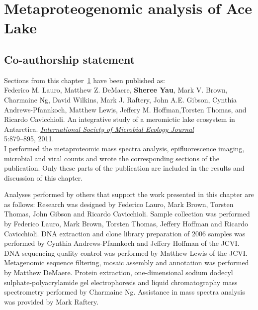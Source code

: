 \chapter{Metaproteogenomic analysis of Ace Lake}
\label{ch:ace}
\section*{Co-authorship statement}

Sections from this chapter~\ref{ch:ace} have been published as:\\

Federico M. Lauro, Matthew Z. DeMaere, \textbf{Sheree Yau}, Mark V. Brown, Charmaine Ng,
David Wilkins, Mark J. Raftery, John A.E. Gibson, Cynthia Andrews-Pfannkoch, Matthew Lewis,
Jeffery M. Hoffman,Torsten Thomas, and Ricardo Cavicchioli. 
An integrative study of a meromictic lake ecosystem in Antarctica.
\emph{\underline{International Society of Microbial Ecology Journal}}\\
5:879--895, 2011.\\

I performed the metaproteomic mass spectra analysis, epifluorescence imaging,
microbial and viral counts and wrote the corresponding sections of the publication.
Only these parts of the publication are included in the results and discussion of this chapter.

Analyses performed by others that support the work presented in this chapter are as follows:
Research was designed by Federico Lauro, Mark Brown, Torsten Thomas, John Gibson and Ricardo Cavicchioli.
Sample collection was performed by Federico Lauro, Mark Brown, Torsten Thomas, Jeffery Hoffman and Ricardo Cavicchioli.
DNA extraction and clone library preparation of 2006 samples was performed by Cynthia Andrews-Pfannkoch and Jeffery Hoffman of the \ac{JCVI}.
DNA sequencing quality control was performed by Matthew Lewis of the \ac{JCVI}.
Metagenomic sequence filtering, mosaic assembly and annotation was performed by Matthew DeMaere.
Protein extraction, one-dimensional sodium dodecyl sulphate-polyacrylamide gel electrophoresis and liquid chromatography mass spectrometry performed by Charmaine Ng.
Assistance in mass spectra analysis was provided by Mark Raftery.
\newpage


